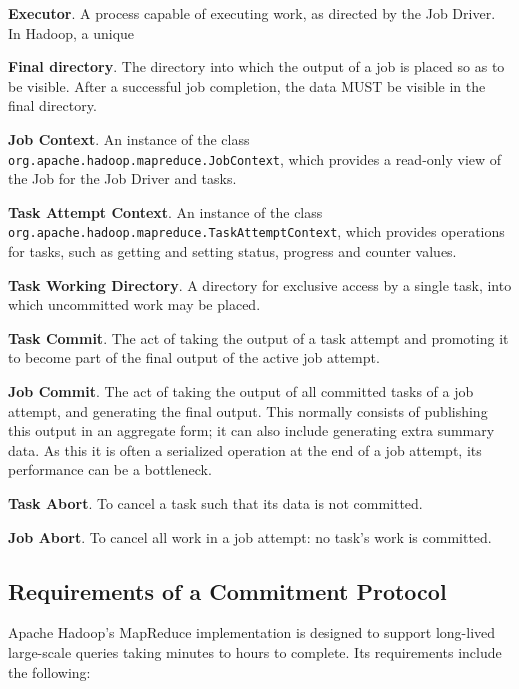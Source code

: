 \documentclass[conference]{IEEEtran}
\begin{document}
\textbf{Executor}.
A process capable of executing work, as directed by the Job Driver.
In Hadoop, a unique

\textbf{Final directory}.
The directory into which the output of a job is placed
so as to be visible.
After a successful job completion, the data MUST be visible in the final directory.


\textbf{Job Context}.
An instance of the class \texttt{org.apache.hadoop.mapreduce.JobContext},
which provides a read-only view of the Job for the Job Driver and tasks.

\textbf{Task Attempt Context}.
An instance of the class
\texttt{org.apache.hadoop.mapreduce.TaskAttemptContext},
which provides operations for tasks, such as getting and setting status,
progress and counter values.

\textbf{Task Working Directory}.
A directory for exclusive access by a single task,
into which uncommitted work may be placed.

\textbf{Task Commit}.
The act of taking the output of a task attempt and promoting it
to become part of the final output of the active job
attempt.

\textbf{Job Commit}.
The act of taking the output of all committed tasks of a job attempt,
and generating the final output.
This normally consists of publishing this output in an aggregate form;
it can also include generating extra summary data.
As this it is often a serialized operation at the end of a job attempt,
its performance can be a bottleneck.

\textbf{Task Abort}.
To cancel a task such that its data is not committed.

\textbf{Job Abort}.
To cancel all work in a job attempt: no task's work is committed.


\subsection{Requirements of a Commitment Protocol}
\label{subsec:requirementsOfACommitmentProtocol}

Apache Hadoop's MapReduce implementation is designed to support long-lived
large-scale queries taking minutes to hours to complete.
Its requirements include the following:
\end{document}
